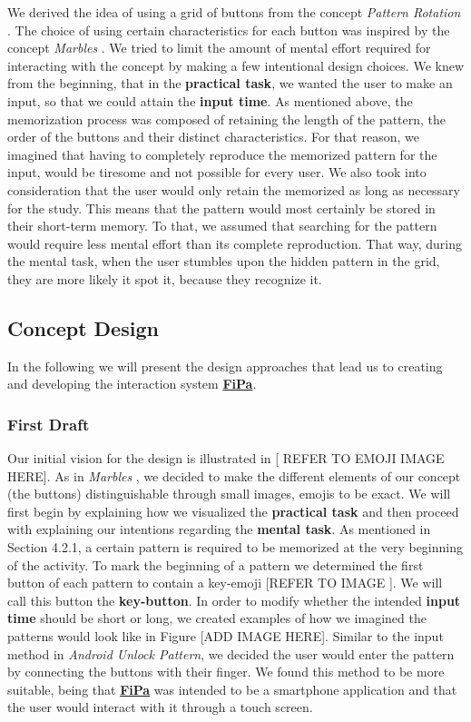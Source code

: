 We derived the idea of using a grid of buttons from the concept \textit{Pattern Rotation} \cite{patternRotation, anonymous}. The choice of using certain characteristics for each button was inspired by the concept \textit{Marbles} \cite{patternRotation, anonymous}. We tried to limit the amount of mental effort required for interacting with the concept by making a few intentional design choices. We knew from the beginning, that in the \textbf{practical task}, we wanted the user to make an input, so that we could attain the \textbf{input time}. As mentioned above, the memorization process was composed of retaining the length of the pattern, the order of the buttons and their distinct characteristics. For that reason, we imagined that having to completely reproduce the memorized pattern for the input, would be tiresome and not possible for every user. We also took into consideration that the user would only retain the memorized as long as necessary for the study. This means that the pattern would most certainly be stored in their short-term memory. To that, we assumed that searching for the pattern would require less mental effort than its complete reproduction. That way, during the mental task, when the user stumbles upon the hidden pattern in the grid, they are more likely it spot it, because they recognize it. 

\subsection{Concept Design} \label{4.2.2}
In the following we will present the design approaches that lead us to creating and developing the interaction system \underline{\textbf{FiPa}}.

\subsubsection{First Draft} \label{4.2.2.1}
Our initial vision for the design is illustrated in [ REFER TO EMOJI IMAGE HERE]. As in \textit{Marbles} \cite{patternRotation, anonymous}, we decided to make the different elements of our concept (the buttons) distinguishable through small images, emojis to be exact. We will first begin by explaining how we visualized the \textbf{practical task} and then proceed with explaining our intentions regarding the \textbf{mental task}. As mentioned in Section 4.2.1, a certain pattern is required to be memorized at the very beginning of the activity. To mark the beginning of a pattern we determined the first button of each pattern to contain a key-emoji [REFER TO IMAGE ]. We will call this button the \textbf{key-button}. In order to modify whether the intended \textbf{input time} should be short or long, we created examples of how we imagined the patterns would look like in Figure [ADD IMAGE HERE]. Similar to the input method in \textit{Android Unlock Pattern}, we decided the user would enter the pattern by connecting the buttons with their finger. We found this method to be more suitable, being that \underline{\textbf{FiPa}} was intended to be a smartphone application and that the user would interact with it through a touch screen. \\

